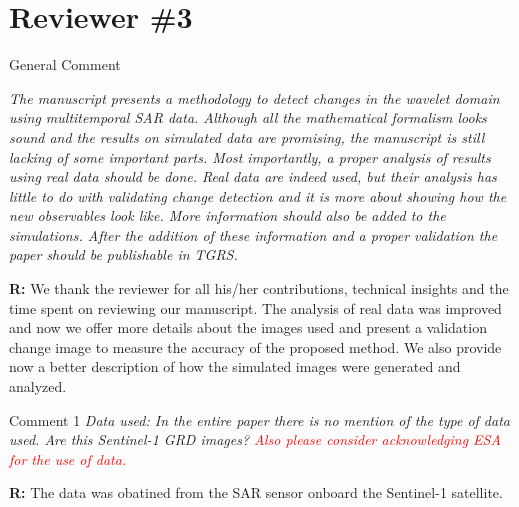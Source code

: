 \documentclass[11pt]{report}
\begin{document}
\section*{Reviewer \#3}


\begin{mybox}{General Comment}

\textit{The manuscript presents a methodology to detect changes in the wavelet domain using multitemporal SAR
data. Although all the mathematical formalism looks sound and the results on simulated data are promising,
the manuscript is still lacking of some important parts. Most importantly, a proper analysis of results using
real data should be done. Real data are indeed used, but their analysis has little to do with validating change
detection and it is more about showing how the new observables look like. More information should also be
added to the simulations. After the addition of these information and a proper validation the paper should be
publishable in TGRS.}
\medskip

\textbf{R:} We thank the reviewer for all his/her contributions, technical insights and the time
spent on reviewing our manuscript. The analysis of real data was improved and now we offer more details about the images used and present a validation change image to measure the accuracy of the proposed method. We also provide now a better description of how the simulated images were generated and analyzed.
\end{mybox}

\medskip
\begin{mybox}{Comment 1}
\textit{Data used: In the entire paper there is no mention of the type of data used. Are this Sentinel-1 GRD images?
\textcolor{red}{Also please consider acknowledging ESA for the use of data.}}


\medskip
\textbf{R:} The data was obatined from the SAR sensor onboard the Sentinel-1 satellite.
\end{mybox}
\end{document}
